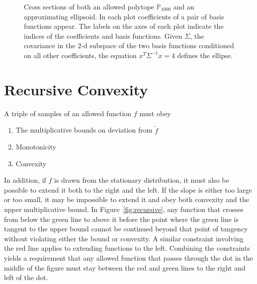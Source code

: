 \documentclass[]{article}
\newcommand{\nomf}{\tilde f} \newcommand{\COST}{\cal C}
\newcommand{\field}[1]{\mathbb{#1}}
\newcommand\Polytope[1]{\field{P}_{#1}}
\begin{document}
\begin{figure*}
  \centering
  \caption{Cross sections of both an allowed polytope $\Polytope{1000}$
    and an approximating ellipsoid.  In each plot coefficients of a
    pair of basis functions appear.  The labels on the axes of each
    plot indicate the indices of the coefficients and basis functions.
    Given $\Sigma$, the covariance in the 2-d subspace of the two
    basis functions conditioned on all other coefficients, the
    equation $x^T \Sigma^{-1} x = 4$ defines the ellipse.}
  \label{fig:ellipsoid}
\end{figure*}

\section{Recursive Convexity}
\label{sec:recursive}

A triple of samples of an allowed function $f$ must obey
\begin{enumerate}
\item The multiplicative bounds on deviation from $\nomf$
\item Monotonicity
\item Convexity
\end{enumerate}
In addition, if $f$ is drawn from the stationary distribution, it must
also be possible to extend it both to the right and the left.  If the
slope is either too large or too small, it may be impossible to extend
it and obey both convexity and the upper multiplicative bound.  In
Figure~\ref{fig:recursive}, any function that crosses from below the
green line to above it before the point where the green line is
tangent to the upper bound cannot be continued beyond that point of
tangency without violating either the bound or convexity.  A similar
constraint involving the red line applies to extending functions to
the left.  Combining the constraints yields a requirement that any
allowed function that passes through the dot in the middle of the
figure must stay between the red and green lines to the right and left
of the dot.
\end{document}
